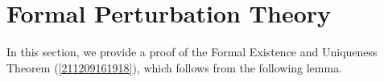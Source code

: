 \documentclass[11pt]{article}
\begin{document}
%


\section{Formal Perturbation Theory}
\label{211218191751}

In this section, we provide a proof of the Formal Existence and Uniqueness Theorem (\autoref{211209161918}), which follows from the following lemma.
\end{document}
